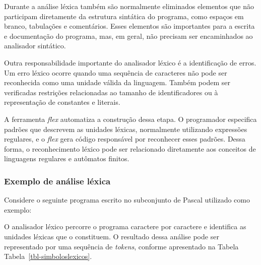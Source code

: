 \documentclass[
  brazilian,
  letterpaper,
]{book}
\newenvironment{Shaded}{\begin{snugshade}}{\end{snugshade}}
\newcommand{\DataTypeTok}[1]{\textcolor[rgb]{0.68,0.00,0.00}{#1}}
\newcommand{\DecValTok}[1]{\textcolor[rgb]{0.68,0.00,0.00}{#1}}
\newcommand{\KeywordTok}[1]{\textcolor[rgb]{0.00,0.23,0.31}{\textbf{#1}}}
\newcommand{\NormalTok}[1]{\textcolor[rgb]{0.00,0.23,0.31}{#1}}
\theoremstyle{plain}
\theoremstyle{definition}
\theoremstyle{remark}
\begin{document}
Durante a análise léxica também são normalmente eliminados elementos que
não participam diretamente da estrutura sintática do programa, como
espaços em branco, tabulações e comentários. Esses elementos são
importantes para a escrita e documentação do programa, mas, em geral,
não precisam ser encaminhados ao analisador sintático.

Outra responsabilidade importante do analisador léxico é a identificação
de erros. Um erro léxico ocorre quando uma sequência de caracteres não
pode ser reconhecida como uma unidade válida da linguagem. Também podem
ser verificadas restrições relacionadas ao tamanho de identificadores ou
à representação de constantes e literais.

A ferramenta \emph{flex} automatiza a construção dessa etapa. O
programador especifica padrões que descrevem as unidades léxicas,
normalmente utilizando expressões regulares, e o \emph{flex} gera código
responsável por reconhecer esses padrões. Dessa forma, o reconhecimento
léxico pode ser relacionado diretamente aos conceitos de linguagens
regulares e autômatos finitos.

\subsubsection{Exemplo de análise
léxica}\label{exemplo-de-anuxe1lise-luxe9xica}

Considere o seguinte programa escrito no subconjunto de Pascal utilizado
como exemplo:

\begin{codelisting}

\caption{\label{lst-cod-pascal}Exemplo de programa em Pascal}

\centering{

\begin{Shaded}
\begin{Highlighting}[]
\KeywordTok{program}\NormalTok{ exemplo;}
\KeywordTok{var}\NormalTok{ A, B: }\DataTypeTok{byte}\NormalTok{;}
\KeywordTok{begin}
\NormalTok{    A := B + }\DecValTok{0.5}\NormalTok{;}
\KeywordTok{end}\NormalTok{.}
\end{Highlighting}
\end{Shaded}

}

\end{codelisting}%

O analisador léxico percorre o programa caractere por caractere e
identifica as unidades léxicas que o constituem. O resultado dessa
análise pode ser representado por uma sequência de \emph{tokens},
conforme apresentado na Tabela Tabela~\ref{tbl-simboloslexicos}.
\end{document}
